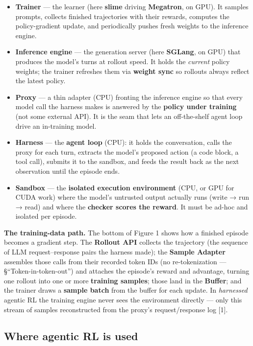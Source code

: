 \documentclass[
  paper=a4,
  ,captions=tableheading
]{scrartcl}
\providecommand{\tightlist}{%
  \setlength{\itemsep}{0pt}\setlength{\parskip}{0pt}}
\begin{document}
\begin{itemize}
\tightlist
\item
  \textbf{Trainer} --- the learner (here \textbf{slime} driving
  \textbf{Megatron}, on GPU). It samples prompts, collects finished
  trajectories with their rewards, computes the policy-gradient update,
  and periodically pushes fresh weights to the inference engine.
\item
  \textbf{Inference engine} --- the generation server (here
  \textbf{SGLang}, on GPU) that produces the model's turns at rollout
  speed. It holds the \emph{current} policy weights; the trainer
  refreshes them via \textbf{weight sync} so rollouts always reflect the
  latest policy.
\item
  \textbf{Proxy} --- a thin adapter (CPU) fronting the inference engine
  so that every model call the harness makes is answered by the
  \textbf{policy under training} (not some external API). It is the seam
  that lets an off-the-shelf agent loop drive an in-training model.
\item
  \textbf{Harness} --- the \textbf{agent loop} (CPU): it holds the
  conversation, calls the proxy for each turn, extracts the model's
  proposed action (a code block, a tool call), submits it to the
  sandbox, and feeds the result back as the next observation until the
  episode ends.
\item
  \textbf{Sandbox} --- the \textbf{isolated execution environment} (CPU,
  or GPU for CUDA work) where the model's untrusted output actually runs
  (write → run → read) and where the \textbf{checker scores the reward}.
  It must be ad-hoc and isolated per episode.
\end{itemize}

\textbf{The training-data path.} The bottom of Figure 1 shows how a
finished episode becomes a gradient step. The \textbf{Rollout API}
collects the trajectory (the sequence of LLM request--response pairs the
harness made); the \textbf{Sample Adapter} assembles those calls from
their recorded token IDs (no re-tokenization ---
§``Token-in-token-out'') and attaches the episode's reward and
advantage, turning one rollout into one or more \textbf{training
samples}; those land in the \textbf{Buffer}; and the trainer draws a
\textbf{sample batch} from the buffer for each update. In
\emph{harnessed} agentic RL the training engine never sees the
environment directly --- only this stream of samples reconstructed from
the proxy's request/response log {[}1{]}.

\hypertarget{where-agentic-rl-is-used}{%
\subsection{Where agentic RL is used}\label{where-agentic-rl-is-used}}
\end{document}
